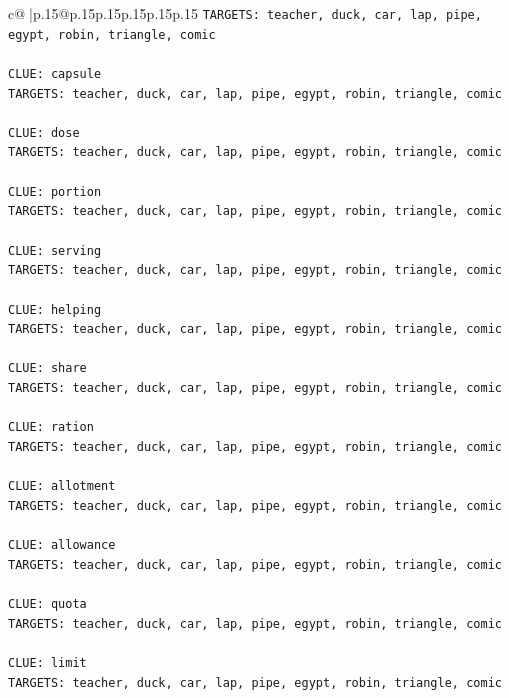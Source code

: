 \documentclass{article}
\begin{document}
{\begin{supertabular}{c@{$\;$}|p{.15\linewidth}@{}p{.15\linewidth}p{.15\linewidth}p{.15\linewidth}p{.15\linewidth}p{.15\linewidth}}
{{{\texttt{TARGETS: teacher, duck, car, lap, pipe, egypt, robin, triangle, comic} \\
\\ 
\texttt{CLUE: capsule} \\
\texttt{TARGETS: teacher, duck, car, lap, pipe, egypt, robin, triangle, comic} \\
\\ 
\texttt{CLUE: dose} \\
\texttt{TARGETS: teacher, duck, car, lap, pipe, egypt, robin, triangle, comic} \\
\\ 
\texttt{CLUE: portion} \\
\texttt{TARGETS: teacher, duck, car, lap, pipe, egypt, robin, triangle, comic} \\
\\ 
\texttt{CLUE: serving} \\
\texttt{TARGETS: teacher, duck, car, lap, pipe, egypt, robin, triangle, comic} \\
\\ 
\texttt{CLUE: helping} \\
\texttt{TARGETS: teacher, duck, car, lap, pipe, egypt, robin, triangle, comic} \\
\\ 
\texttt{CLUE: share} \\
\texttt{TARGETS: teacher, duck, car, lap, pipe, egypt, robin, triangle, comic} \\
\\ 
\texttt{CLUE: ration} \\
\texttt{TARGETS: teacher, duck, car, lap, pipe, egypt, robin, triangle, comic} \\
\\ 
\texttt{CLUE: allotment} \\
\texttt{TARGETS: teacher, duck, car, lap, pipe, egypt, robin, triangle, comic} \\
\\ 
\texttt{CLUE: allowance} \\
\texttt{TARGETS: teacher, duck, car, lap, pipe, egypt, robin, triangle, comic} \\
\\ 
\texttt{CLUE: quota} \\
\texttt{TARGETS: teacher, duck, car, lap, pipe, egypt, robin, triangle, comic} \\
\\ 
\texttt{CLUE: limit} \\
\texttt{TARGETS: teacher, duck, car, lap, pipe, egypt, robin, triangle, comic} \\
}}}
\end{supertabular}}
\end{document}
